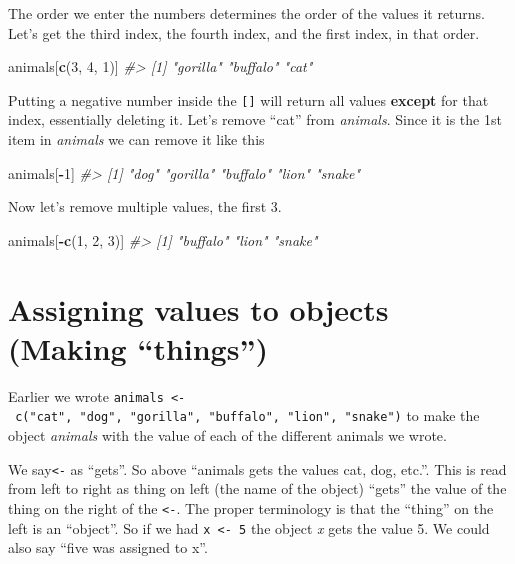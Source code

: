 \documentclass[
  12pt,
]{book}
\newenvironment{Shaded}{\begin{snugshade}}{\end{snugshade}}
\newcommand{\CommentTok}[1]{\textcolor[rgb]{0.56,0.35,0.01}{\textit{#1}}}
\newcommand{\DecValTok}[1]{\textcolor[rgb]{0.00,0.00,0.81}{#1}}
\newcommand{\KeywordTok}[1]{\textcolor[rgb]{0.13,0.29,0.53}{\textbf{#1}}}
\newcommand{\NormalTok}[1]{#1}
\newcommand{\OperatorTok}[1]{\textcolor[rgb]{0.81,0.36,0.00}{\textbf{#1}}}
\begin{document}
The order we enter the numbers determines the order of the values it returns. Let's get the third index, the fourth index, and the first index, in that order.

\begin{Shaded}
\begin{Highlighting}[]
\NormalTok{animals[}\KeywordTok{c}\NormalTok{(}\DecValTok{3}\NormalTok{, }\DecValTok{4}\NormalTok{, }\DecValTok{1}\NormalTok{)]}
\CommentTok{\#> [1] "gorilla" "buffalo" "cat"}
\end{Highlighting}
\end{Shaded}

Putting a negative number inside the \texttt{{[}{]}} will return all values \textbf{except} for that index, essentially deleting it. Let's remove ``cat'' from \emph{animals}. Since it is the 1st item in \emph{animals} we can remove it like this

\begin{Shaded}
\begin{Highlighting}[]
\NormalTok{animals[}\OperatorTok{{-}}\DecValTok{1}\NormalTok{]}
\CommentTok{\#> [1] "dog"     "gorilla" "buffalo" "lion"    "snake"}
\end{Highlighting}
\end{Shaded}

Now let's remove multiple values, the first 3.

\begin{Shaded}
\begin{Highlighting}[]
\NormalTok{animals[}\OperatorTok{{-}}\KeywordTok{c}\NormalTok{(}\DecValTok{1}\NormalTok{, }\DecValTok{2}\NormalTok{, }\DecValTok{3}\NormalTok{)]}
\CommentTok{\#> [1] "buffalo" "lion"    "snake"}
\end{Highlighting}
\end{Shaded}

\hypertarget{assignment}{%
\section{Assigning values to objects (Making ``things'')}\label{assignment}}

Earlier we wrote \texttt{animals\ \textless{}-\ c("cat",\ "dog",\ "gorilla",\ "buffalo",\ "lion",\ "snake")} to make the object \emph{animals} with the value of each of the different animals we wrote.

We say\texttt{\textless{}-} as ``gets''. So above ``animals gets the values cat, dog, etc.''. This is read from left to right as thing on left (the name of the object) ``gets'' the value of the thing on the right of the \texttt{\textless{}-}. The proper terminology is that the ``thing'' on the left is an ``object''. So if we had \texttt{x\ \textless{}-\ 5} the object \emph{x} gets the value 5. We could also say ``five was assigned to x''.
\end{document}
